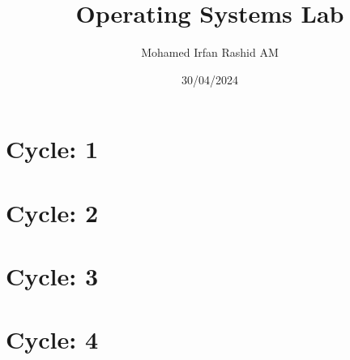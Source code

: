 \documentclass[9pt]{Lab_Report_Class}
\begin{document}
\setlength{\headheight}{20pt}
\title{Operating Systems Lab}
\author{Mohamed Irfan Rashid AM}
\date{30/04/2024}

\begingroup
\pagestyle{plain}
\maketitle
\tableofcontents
\endgroup

\part{Cycle: 1}





\part{Cycle: 2}




\part{Cycle: 3}




\part{Cycle: 4}



\end{document}
